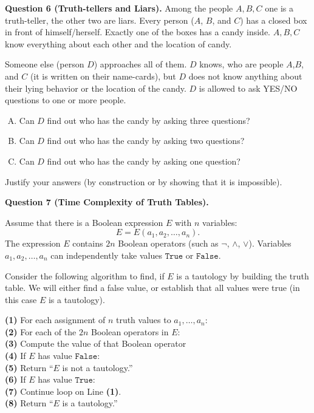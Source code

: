 \documentclass[jou]{apa6}
\begin{document}
\vspace{10pt}
{\bf Question 6 (Truth-tellers and Liars).}
Among the people $A,B,C$ one is a truth-teller, 
the other two are liars. 
Every person ($A$, $B$, and $C$) has a closed box
in front of himself/herself. Exactly one of the 
boxes has a candy inside. $A,B,C$ know everything 
about each other and the location of candy.

Someone else (person $D$) approaches all of them. $D$ knows, who are 
people $A$,$B$, and $C$ (it is written on their name-cards), but $D$ does
not know anything about their lying behavior or the location of the candy.
$D$ is allowed to ask YES/NO questions to one or more people.

\begin{enumerate}[(A)]
\item Can $D$ find out who has the candy by asking three questions?
\item Can $D$ find out who has the candy by asking two questions?
\item Can $D$ find out who has the candy by asking one question?
\end{enumerate}

Justify your answers (by construction or by showing that it is impossible).


\vspace{10pt}
{\bf Question 7 (Time Complexity of Truth Tables).}

Assume that there is a Boolean expression $E$ with $n$ variables: 
$$E = E(a_1,a_2,\ldots,a_n).$$
The expression $E$ contains $2n$ Boolean operators (such as $\neg$, $\wedge$, $\vee$).
Variables $a_1,a_2,\ldots,a_n$ can independently take values 
$\mathtt{True}$ or $\mathtt{False}$.

Consider the following algorithm to find, if $E$ is a tautology by 
building the truth table. We will either find a false value, or 
establish that all values were true (in this case $E$ is a tautology).

{\bf (1)} \hspace{0.0in} For each assignment of $n$ truth values to $a_1,\ldots,a_n$:\\
{\bf (2)} \hspace{0.2in} For each of the $2n$ Boolean operators in $E$:\\
{\bf (3)} \hspace{0.4in} Compute the value of that Boolean operator\\
{\bf (4)} \hspace{0.2in} If $E$ has value $\mathtt{False}$:\\
{\bf (5)} \hspace{0.4in} Return ``$E$ is not a tautology.''\\
{\bf (6)} \hspace{0.2in} If $E$ has value $\mathtt{True}$:\\
{\bf (7)} \hspace{0.4in} Continue loop on Line {\bf (1)}.\\
{\bf (8)} \hspace{0.0in} Return ``$E$ is a tautology.''
\end{document}
